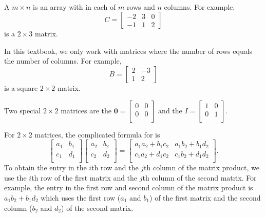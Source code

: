 \begin{defn}
\label{defn_matrix}
~
    \begin{apart}
        \item A $m \times n$  is an array with  in each of $m$ rows and $n$ columns.  For example, 
            $$C = \left[ \begin{array}{ccc}
            -2 & 3 & 0 \\ -1 & 1 & 2
            \end{array} \right]$$
        is a $2 \times 3$ matrix. 
        \item In this textbook, we only work with  matrices where the number of rows equals the number of columns. For example,
            $$B = \left[ \begin{array}{rr}
            2 & -3 \\ 1 & 2
            \end{array} \right]$$
        is a square $2 \times 2$ matrix.
        \item Two special $2 \times 2$ matrices are the     $\mathbf{0} = \left[ \begin{array}{cc} 0 & 0\\ 0 & 0 \\ \end{array} \right]$ and the  $I = \left[ \begin{array}{cc} 1 & 0\\ 0 & 1 \\ \end{array} \right]$.
        
        \item For $2 \times 2$ matrices, the complicated formula for  is
           $$\left[ \begin{array}{cc} a_1 & b_1 \\ c_1 & d_1 \\ \end{array} \right]\left[ \begin{array}{cc} a_2 & b_2 \\ c_2 & d_2 \\ \end{array} \right]=\left[ \begin{array}{cc} a_1a_2 + b_1c_2 & a_1b_2+b_1d_2\\ c_1a_2 + d_1c_2 & c_1b_2+d_1d_2 \\ \end{array} \right].$$  
           To obtain the entry in the $i$th row and the $j$th column of the matrix product, we use the $i$th row of the first matrix and the $j$th column of the second matrix. For example, the entry in the first row and second column of the matrix product is $a_1b_2+b_1d_2$ which uses the first row ($a_1$ and $b_1$) of the first matrix and the second column ($b_2$ and $d_2$) of the second matrix.
           

\end{apart}
\end{defn}
